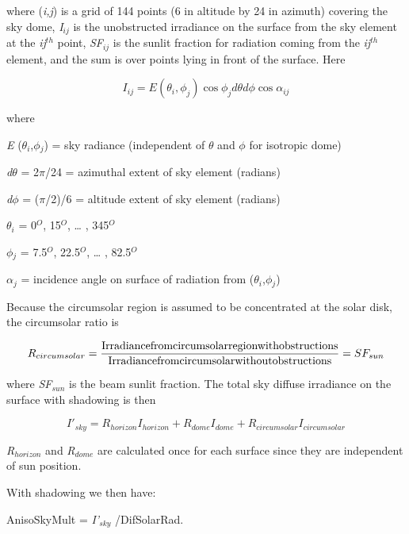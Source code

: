 where (\emph{i,j}) is a grid of 144 points (6 in altitude by 24 in azimuth) covering the sky dome, \emph{I\(_{ij}\)} is the unobstructed irradiance on the surface from the sky element at the \emph{ij}\(^{th}\) point, \emph{SF\(_{ij}\)} is the sunlit fraction for radiation coming from the \emph{ij}\(^{th}\) element, and the sum is over points lying in front of the surface. Here

\begin{equation}
{I_{ij}} = E({\theta_i},{\phi_j})\cos {\phi_j}d\theta d\phi \cos {\alpha_{ij}}
\end{equation}

where

\emph{E} (\emph{$\theta$\(_{i}\)},\emph{$\phi$\(_{j}\)}) = sky radiance (independent of $\theta$ and $\phi$ for isotropic dome)

\emph{d$\theta$} = 2$\pi$/24 = azimuthal extent of sky element (radians)

\emph{d$\phi$} = ($\pi$/2)/6 = altitude extent of sky element (radians)

\emph{$\theta$\(_{i}\)} = 0\(^{O}\), 15\(^{O}\), \ldots{} , 345\(^{O}\)

\emph{$\phi$\(_{j}\)} = 7.5\(^{O}\), 22.5\(^{O}\), \ldots{} , 82.5\(^{O}\)

$\alpha$\(_{j}\) = incidence angle on surface of radiation from (\emph{$\theta$\(_{i}\)},\emph{$\phi$\(_{j}\)})

Because the circumsolar region is assumed to be concentrated at the solar disk, the circumsolar ratio is

\begin{equation}
{R_{circumsolar}} = \frac{{{\rm{Irradiance from circumsolar region with obstructions}}}}{{{\rm{Irradiance from circumsolar without obstructions}}}} = S{F_{sun}}
\end{equation}

where \emph{SF\(_{sun}\)} is the beam sunlit fraction. The total sky diffuse irradiance on the surface with shadowing is then

\begin{equation}
{I'_{sky}} = {R_{horizon}}{I_{horizon}} + {R_{dome}}{I_{dome}} + {R_{circumsolar}}{I_{circumsolar}}
\end{equation}

\emph{R\(_{horizon}\)} and \emph{R\(_{dome}\)} are calculated once for each surface since they are independent of sun position.

With shadowing we then have:

AnisoSkyMult = \emph{I'\(_{sky}\)} /DifSolarRad.

